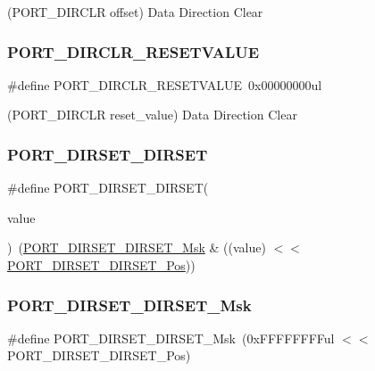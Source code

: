(P\+O\+R\+T\+\_\+\+D\+I\+R\+C\+LR offset) Data Direction Clear 

\mbox{\label{group___s_a_m_d21___p_o_r_t_gae97e35763f237bbf69af7623183891a1}} 
\subsubsection{\texorpdfstring{PORT\_DIRCLR\_RESETVALUE}{PORT\_DIRCLR\_RESETVALUE}}
{\footnotesize\ttfamily \#define P\+O\+R\+T\+\_\+\+D\+I\+R\+C\+L\+R\+\_\+\+R\+E\+S\+E\+T\+V\+A\+L\+UE~0x00000000ul}



(P\+O\+R\+T\+\_\+\+D\+I\+R\+C\+LR reset\+\_\+value) Data Direction Clear 

\mbox{\label{group___s_a_m_d21___p_o_r_t_ga75a539d2c42e4d5058181a8700b8e9c0}} 
\subsubsection{\texorpdfstring{PORT\_DIRSET\_DIRSET}{PORT\_DIRSET\_DIRSET}}
{\footnotesize\ttfamily \#define P\+O\+R\+T\+\_\+\+D\+I\+R\+S\+E\+T\+\_\+\+D\+I\+R\+S\+ET(\begin{DoxyParamCaption}\item[{}]{value }\end{DoxyParamCaption})~(\mbox{\hyperlink{group___s_a_m_d21___p_o_r_t_ga0b4a8e93964c1bedc8f48b0fa037e500}{P\+O\+R\+T\+\_\+\+D\+I\+R\+S\+E\+T\+\_\+\+D\+I\+R\+S\+E\+T\+\_\+\+Msk}} \& ((value) $<$$<$ \mbox{\hyperlink{group___s_a_m_d21___p_o_r_t_gaa2c0a845406e6ca4e31556d413108aeb}{P\+O\+R\+T\+\_\+\+D\+I\+R\+S\+E\+T\+\_\+\+D\+I\+R\+S\+E\+T\+\_\+\+Pos}}))}

\mbox{\label{group___s_a_m_d21___p_o_r_t_ga0b4a8e93964c1bedc8f48b0fa037e500}} 
\subsubsection{\texorpdfstring{PORT\_DIRSET\_DIRSET\_Msk}{PORT\_DIRSET\_DIRSET\_Msk}}
{\footnotesize\ttfamily \#define P\+O\+R\+T\+\_\+\+D\+I\+R\+S\+E\+T\+\_\+\+D\+I\+R\+S\+E\+T\+\_\+\+Msk~(0x\+F\+F\+F\+F\+F\+F\+F\+Ful $<$$<$ P\+O\+R\+T\+\_\+\+D\+I\+R\+S\+E\+T\+\_\+\+D\+I\+R\+S\+E\+T\+\_\+\+Pos)}

